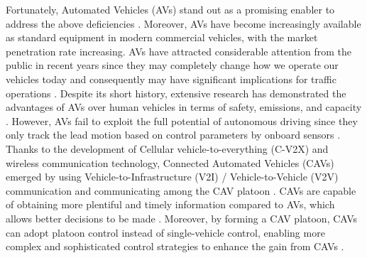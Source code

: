 \documentclass[a4paper]{cas-sc}
\begin{document}
Fortunately, Automated Vehicles (AVs) stand out as a promising enabler to address the above deficiencies \citep{Rudin-Brown2004,Nikolos2015a}. Moreover, AVs have become increasingly available as standard equipment in modern commercial vehicles, with the market penetration rate increasing. AVs have attracted considerable attention from the public in recent years since they may completely change how we operate our vehicles today and consequently may have significant implications for traffic operations \citep{Kesting2007,Delis2016}. Despite its short history, extensive research has demonstrated the advantages of AVs over human vehicles in terms of safety, emissions, and capacity \citep{Ngoduy2012,Ioannou2005,Kerner2021}.
However, AVs fail to exploit the full potential of autonomous driving since they only track the lead motion based on control parameters by onboard sensors \citep{Ruan2022,Brunner2022}. Thanks to the development of Cellular vehicle-to-everything (C-V2X) and wireless communication technology, Connected Automated Vehicles (CAVs) emerged by using Vehicle-to-Infrastructure (V2I) / Vehicle-to-Vehicle (V2V) communication and communicating among the CAV platoon \citep{Wang2022,Qin2021a}. CAVs are capable of obtaining more plentiful and timely information compared to AVs, which allows better decisions to be made \citep{Mu2021,Liu2021b}. Moreover, by forming a CAV platoon, CAVs can adopt platoon control instead of single-vehicle control, enabling more complex and sophisticated control strategies to enhance the gain from CAVs \citep{Kim2021,Yang2021,Zhou2021a}.
\end{document}

